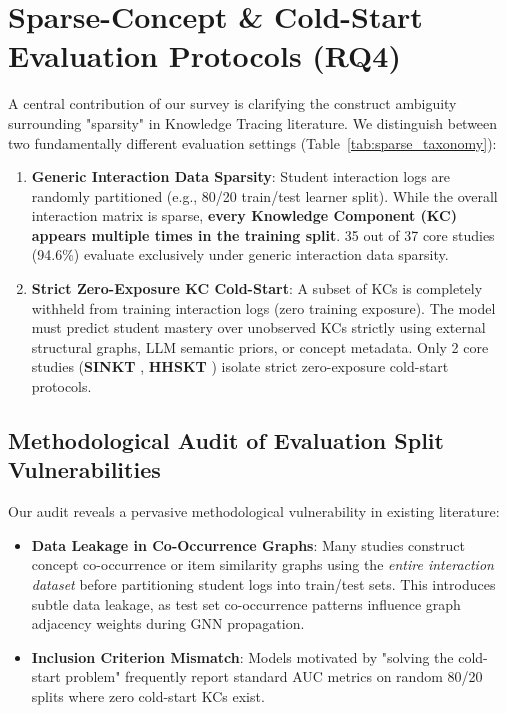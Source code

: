 ﻿\documentclass[10pt,journal,compsoc]{IEEEtran}
\begin{document}
\section{Sparse-Concept \& Cold-Start Evaluation Protocols (RQ4)}

A central contribution of our survey is clarifying the construct ambiguity surrounding "sparsity" in Knowledge Tracing literature. We distinguish between two fundamentally different evaluation settings (Table~\ref{tab:sparse_taxonomy}):
\begin{enumerate}
    \item \textbf{Generic Interaction Data Sparsity}: Student interaction logs are randomly partitioned (e.g., 80/20 train/test learner split). While the overall interaction matrix is sparse, \textbf{every Knowledge Component (KC) appears multiple times in the training split}. 35 out of 37 core studies (94.6\%) evaluate exclusively under generic interaction data sparsity.
    \item \textbf{Strict Zero-Exposure KC Cold-Start}: A subset of KCs is completely withheld from training interaction logs (zero training exposure). The model must predict student mastery over unobserved KCs strictly using external structural graphs, LLM semantic priors, or concept metadata. Only 2 core studies (\textbf{SINKT} \cite{KT044_SINKT_2024}, \textbf{HHSKT} \cite{KT035_HHSKT_2023}) isolate strict zero-exposure cold-start protocols.
\end{enumerate}

\subsection{Methodological Audit of Evaluation Split Vulnerabilities}
Our audit reveals a pervasive methodological vulnerability in existing literature:
\begin{itemize}
    \item \textbf{Data Leakage in Co-Occurrence Graphs}: Many studies construct concept co-occurrence or item similarity graphs using the \emph{entire interaction dataset} before partitioning student logs into train/test sets. This introduces subtle data leakage, as test set co-occurrence patterns influence graph adjacency weights during GNN propagation.
    \item \textbf{Inclusion Criterion Mismatch}: Models motivated by "solving the cold-start problem" frequently report standard AUC metrics on random 80/20 splits where zero cold-start KCs exist.
\end{itemize}
\end{document}
